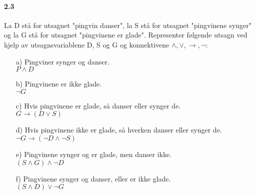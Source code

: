 \documentclass[12pt, norsk, a4paper]{article}
\begin{document}
\paragraph*{2.3} La D stå for utsagnet "pingvin danser", la S stå for utsagnet "pingvinene synger" og la G stå for utsagnet "pingvinene er glade". Representer følgende utsagn ved hjelp av utsagnsvariablene D, S og G og konnektivene $\wedge, \vee, \rightarrow, \neg$:
\begin{itemize}
\item[a)] Pingviner synger og danser. \\

$P \wedge D$

\item[b)] Pingvinene er ikke glade. \\

$\neg G$

\item[c)] Hvis pingvinene er glade, så danser eller synger de. \\

$G \rightarrow (D \vee S)$

\item[d)] Hvis pingvinene ikke er glade, så hverken danser eller synger de. \\

$\neg G \rightarrow (\neg D \wedge \neg S)$

\item[e)] Pingvinene synger og er glade, men danser ikke. \\

$(S \wedge G) \wedge \neg D$

\item[f)] Pingvinene synger og danser, eller er ikke glade. \\

$(S \wedge D) \vee \neg G$
\end{itemize}
\end{document}
